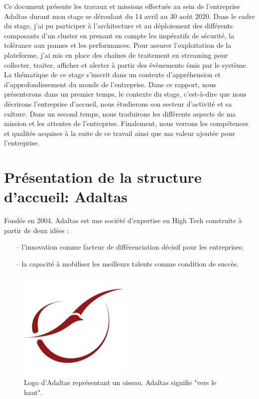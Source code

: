 \documentclass[12pt, french]{report}
\begin{document}
Ce document présente les travaux et missions effectués au sein de l'entreprise Adaltas durant mon stage se déroulant du 14 avril au 30 août 2020. Dans le cadre du stage, j'ai pu participer à l’architecture et au déploiement des différents composants d'un cluster en prenant en compte les impératifs de sécurité, la tolérance aux pannes et les performances. Pour assurer l’exploitation de la plateforme, j'ai mis en place des chaînes de traitement en streaming pour collecter, traiter, afficher et alerter à partir des évènements émis par le système.\\

La thématique de ce stage s’inscrit dans un contexte d’appréhension et d'approfondissement du monde de l’entreprise. Dans ce rapport, nous présenterons dans un premier temps, le contexte du stage, c’est-à-dire que nous décrirons l’entreprise d’accueil, nous étudierons son secteur d’activité et sa culture. Dans un second temps, nous traduirons les différents aspects de ma mission et les attentes de l'entreprise. Finalement, nous verrons les compétences et qualités acquises à la suite de ce travail ainsi que ma valeur ajoutée pour l'entreprise.

\chapter{Présentation de la structure d'accueil: Adaltas}

Fondée en 2004, Adaltas est une société d’expertise en High Tech construite à partir de deux idées :
\begin{itemize}
  \item[--] l’innovation comme facteur de différenciation décisif pour les entreprises;
  \item[--] la capacité à mobiliser les meilleurs talents comme condition de succès.\\
\end{itemize}

\begin{figure}[H]
\includegraphics[scale=0.4]{assets/img/logo-adaltas.png}
\centering
\caption{Logo d'Adaltas représentant un oiseau. Adaltas signifie "vers le haut".}
\label{fig:logo-adaltas}
\end{figure}
\end{document}

